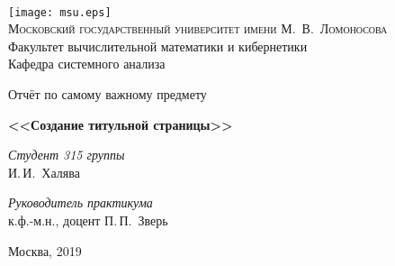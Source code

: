 \documentclass[11pt]{article}
\begin{document}
\thispagestyle{empty}

\begin{center}
\ \vspace{-3cm}

\texttt{[image: msu.eps]}\\
{\scshape Московский государственный университет имени М.~В.~Ломоносова}\\
Факультет вычислительной математики и кибернетики\\
Кафедра системного анализа

\vfill

{\LARGE Отчёт по самому важному предмету}

\vspace{1cm}

{\Huge\bfseries <<Создание титульной страницы>>}
\end{center}

\vspace{1cm}

\begin{flushright}
  \large
  \textit{Студент 315 группы}\\
  И.\,И.~Халява

  \vspace{5mm}

  \textit{Руководитель практикума}\\
  к.ф.-м.н., доцент П.\,П.~Зверь
\end{flushright}

\vfill

\begin{center}
Москва, 2019
\end{center}
\end{document}

